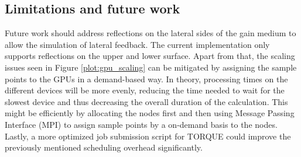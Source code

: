 \subsection{Limitations and future work}
\label{subsec:limitations}
Future work should address reflections on the lateral sides of the gain medium
to allow the simulation of lateral feedback. The current implementation only
supports reflections on the upper and lower surface. Apart from that, the
scaling issues seen in Figure \ref{plot:gpu_scaling} can be mitigated by
assigning the sample points to the GPUs in a demand-based way. In theory,
processing times on the different devices will be more evenly, reducing the time
needed to wait for the slowest device and thus decreasing the overall duration
of the calculation. This might be efficiently by allocating the nodes first and
then using Message Passing Interface (MPI)\cite{MPI} to assign sample points by
a on-demand basis to the nodes. Lastly, a more optimized job submission script
for TORQUE could improve the previously mentioned scheduling overhead
significantly.
